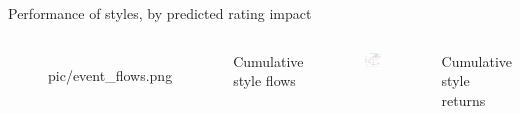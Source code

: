 \documentclass[UTF8, 16pt]{beamer}
\begin{document}
\begin{CJK*}{UTF8}{gbsn}
\begin{frame}{Performance of styles, by predicted rating impact}
\begin{columns}
\begin{figure}[htpb]
\begin{center}
		    {pic/event_flows.png}
		  \end{center}
		\end{figure}
		\vspace{-0.6cm}
		\center\tiny{Cumulative style flows}
		\begin{figure}[htpb]
		  \begin{center}
		    \includegraphics[width=1  \linewidth]
		    {pic/event_returns.png}
		  \end{center}
		\end{figure}
		\vspace{-0.6cm}
		\center\tiny{Cumulative style returns}
	\end{columns}
\end{frame}


\end{CJK*}
\end{document}
